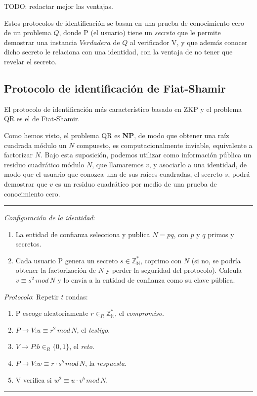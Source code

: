 TODO: redactar mejor las ventajas.

Estos protocolos de identificación se basan en una prueba de conocimiento cero de un problema $Q$, donde P (el usuario) tiene un \textit{secreto} que le permite demostrar una instancia $Verdadera$ de $Q$ al verificador V, y que además conocer dicho secreto le relaciona con una identidad, con la ventaja de no tener que revelar el secreto.


\subsection{Protocolo de identificación de Fiat-Shamir}

El protocolo  de identificación más característico basado en ZKP y el problema QR es el de Fiat-Shamir.

Como hemos visto, el problema QR es \textbf{NP}, de modo que obtener una raíz cuadrada módulo un $N$ compuesto, es computacionalmente inviable, equivalente a factorizar $N$. Bajo esta suposición, podemos utilizar como información pública un residuo cuadrático módulo $N$, que llamaremos $v$, y asociarlo a una identidad, de modo que el usuario que conozca una de sus raíces cuadradas, el secreto $s$, podrá demostrar que $v$ es un residuo cuadrático por medio de una prueba de conocimiento cero.


\rule{\textwidth}{1pt}
\begin{algorithm}
	\hfil
	
	\textit{Configuración de la identidad}:
	\begin{enumerate}
		\item La entidad de confianza selecciona y publica $N=pq$, con $p$ y $q$ primos y secretos.
		
		\item Cada usuario P genera un secreto $s \in \mathbb{Z_N^*}$, coprimo con $N$ (si no, se podría obtener la factorización de $N$ y perder la seguridad del protocolo). Calcula $v \equiv s^2 \, mod \, N$ y lo envía a la entidad de confianza como su clave pública.
		
	\end{enumerate}
	
	
	\textit{Protocolo}: Repetir $t$ rondas:
	\begin{enumerate}
		\item P escoge aleatoriamente $r \in_R \mathbb{Z_N^*}$, el \textit{compromiso}.
		\item $P \rightarrow V$:\quad $u \equiv r^2 \, mod \, N$, el \textit{testigo}.
		\item $V \rightarrow P$:\quad $b \in_R \{0,1\}$, el \textit{reto}.
		\item $P \rightarrow V$:\quad $w \equiv r\cdot s^b \, mod \, N$, la \textit{respuesta}.
		\item V verifica si \quad $ w^2 \equiv u\cdot v^b \, mod \, N$.
	\end{enumerate}
	
\end{algorithm}
\rule{\textwidth}{1pt}

